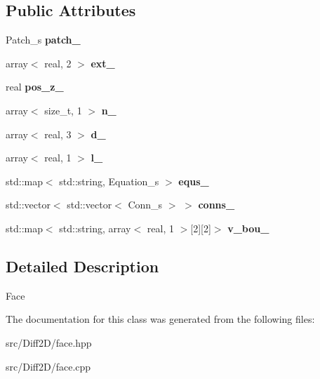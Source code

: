\subsection*{Public Attributes}
\begin{DoxyCompactItemize}
\item 
\hypertarget{classFace_a2e53c055a4d8492b42995db563e1fc7a}{
Patch\_\-s {\bfseries patch\_\-}}
\label{classFace_a2e53c055a4d8492b42995db563e1fc7a}

\item 
\hypertarget{classFace_a0922668c4175d0274024a5869b310a63}{
array$<$ real, 2 $>$ {\bfseries ext\_\-}}
\label{classFace_a0922668c4175d0274024a5869b310a63}

\item 
\hypertarget{classFace_a639f6d684b3a55d69528b5b6f5976937}{
real {\bfseries pos\_\-z\_\-}}
\label{classFace_a639f6d684b3a55d69528b5b6f5976937}

\item 
\hypertarget{classFace_af798b428f231a2f7fad13a386a5c4d7f}{
array$<$ size\_\-t, 1 $>$ {\bfseries n\_\-}}
\label{classFace_af798b428f231a2f7fad13a386a5c4d7f}

\item 
\hypertarget{classFace_a7d41239f934e8819874b5fb515d43380}{
array$<$ real, 3 $>$ {\bfseries d\_\-}}
\label{classFace_a7d41239f934e8819874b5fb515d43380}

\item 
\hypertarget{classFace_a75033fb2521fcb2c613782f831f42bb3}{
array$<$ real, 1 $>$ {\bfseries l\_\-}}
\label{classFace_a75033fb2521fcb2c613782f831f42bb3}

\item 
\hypertarget{classFace_a46b37a1eaba00ad44cf46b6da1391b30}{
std::map$<$ std::string, Equation\_\-s $>$ {\bfseries equs\_\-}}
\label{classFace_a46b37a1eaba00ad44cf46b6da1391b30}

\item 
\hypertarget{classFace_ac831a8581fa641c54f4adb6e6b3dfe71}{
std::vector$<$ std::vector$<$ Conn\_\-s $>$ $>$ {\bfseries conns\_\-}}
\label{classFace_ac831a8581fa641c54f4adb6e6b3dfe71}

\item 
\hypertarget{classFace_a982045b07b690ea86fc8faa77a1cc534}{
std::map$<$ std::string, array$<$ real, 1 $>$\mbox{[}2\mbox{]}\mbox{[}2\mbox{]}$>$ {\bfseries v\_\-bou\_\-}}
\label{classFace_a982045b07b690ea86fc8faa77a1cc534}

\end{DoxyCompactItemize}


\subsection{Detailed Description}
Face 

The documentation for this class was generated from the following files:\begin{DoxyCompactItemize}
\item 
src/Diff2D/face.hpp\item 
src/Diff2D/face.cpp\end{DoxyCompactItemize}
